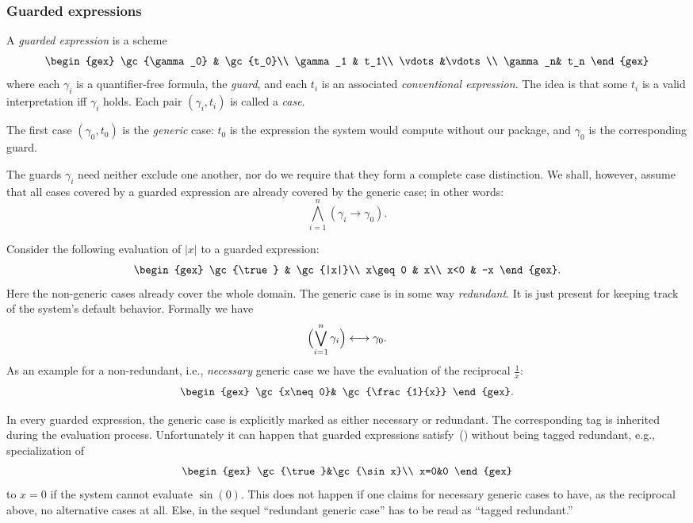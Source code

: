 \subsubsection{Guarded expressions}
A {\em guarded expression} is a scheme
\[
\begin{gex}
\gc{\gamma_0} & \gc{t_0}\\
\gamma_1 & t_1\\
\vdots&\vdots\\
\gamma_n& t_n
\end{gex}
\]
where each $\gamma_i$ is a quantifier-free formula, the {\em guard},
and each $t_i$ is an associated {\em conventional expression}. The
idea is that some $t_i$ is a valid interpretation iff $\gamma_i$
holds. Each pair $(\gamma_i,t_i)$ is called a {\em case}.

The first case $(\gamma_0,t_0)$ is the {\em generic} case: $t_0$ is
the expression the system would compute without our package, and
$\gamma_0$ is the corresponding guard.

The guards $\gamma_i$ need neither exclude one another, nor do we
require that they form a complete case distinction. We shall, however,
assume that all cases covered by a guarded expression are already
covered by the generic case; in other words:
\begin{equation}
\bigwedge_{i=1}^n(\gamma_i\longrightarrow\gamma_0).\label{gencoversall}
\end{equation}

Consider the following evaluation of $|x|$ to a guarded expression:
\[
\begin{gex}
\gc{\true} & \gc{|x|}\\
x\geq0 & x\\
x<0 & -x
\end{gex}.
\]
Here the non-generic cases already cover the whole domain. The
generic case is in some way {\em redundant}. It is just present for
keeping track of the system's default behavior. Formally we have
\begin{equation}
\Bigl(\bigvee_{i=1}^n\gamma_i\Bigr)\longleftrightarrow\gamma_0.
\label{formalredund}
\end{equation}
As an example for a non-redundant, i.e., {\em necessary} generic case
we have the evaluation of the reciprocal $\frac{1}{x}$:
\[
\begin{gex}
\gc{x\neq0}& \gc{\frac{1}{x}}
\end{gex}.
\]

In every guarded expression, the generic case is explicitly marked as
either necessary or redundant. The corresponding tag is inherited
during the evaluation process. Unfortunately it can happen that
guarded expressions satisfy~() without being tagged
redundant, e.g., specialization of
\[
\begin{gex}
\gc{\true}&\gc{\sin x}\\
x=0&0
\end{gex}
\]
to $x=0$ if the system cannot evaluate $\sin(0)$. This does not happen
if one claims for necessary generic cases to have, as the reciprocal
above, no alternative cases at all. Else, in the sequel ``redundant
generic case'' has to be read as ``tagged redundant.''

